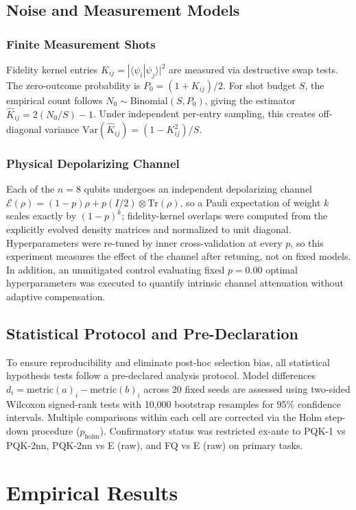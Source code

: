 \documentclass[conference]{IEEEtran}
\begin{document}
\subsection{Noise and Measurement Models}
\subsubsection{Finite Measurement Shots}
Fidelity kernel entries $K_{ij} = |\langle \psi_i | \psi_j \rangle|^2$ are measured via destructive swap tests. The zero-outcome probability is $P_0 = (1 + K_{ij})/2$. For shot budget $S$, the empirical count follows $N_0 \sim \text{Binomial}(S, P_0)$, giving the estimator $\hat{K}_{ij} = 2(N_0/S) - 1$. Under independent per-entry sampling, this creates off-diagonal variance $\text{Var}(\hat{K}_{ij}) = (1 - K_{ij}^2)/S$.

\subsubsection{Physical Depolarizing Channel}
Each of the $n = 8$ qubits undergoes an independent depolarizing channel $\mathcal{E}(\rho) = (1-p)\rho + p(I/2) \otimes \text{Tr}(\rho)$, so a Pauli expectation of weight $k$ scales exactly by $(1-p)^k$; fidelity-kernel overlaps were computed from the explicitly evolved density matrices and normalized to unit diagonal. Hyperparameters were re-tuned by inner cross-validation at every $p$, so this experiment measures the effect of the channel after retuning, not on fixed models. In addition, an unmitigated control evaluating fixed $p=0.00$ optimal hyperparameters was executed to quantify intrinsic channel attenuation without adaptive compensation.

\subsection{Statistical Protocol and Pre-Declaration}
To ensure reproducibility and eliminate post-hoc selection bias, all statistical hypothesis tests follow a pre-declared analysis protocol. Model differences $d_i = \text{metric}(a)_i - \text{metric}(b)_i$ across 20 fixed seeds are assessed using two-sided Wilcoxon signed-rank tests with 10,000 bootstrap resamples for 95\% confidence intervals. Multiple comparisons within each cell are corrected via the Holm step-down procedure ($p_{\text{holm}}$). Confirmatory status was restricted ex-ante to PQK-1 vs PQK-2nn, PQK-2nn vs E (raw), and FQ vs E (raw) on primary tasks.

\section{Empirical Results}
\end{document}
